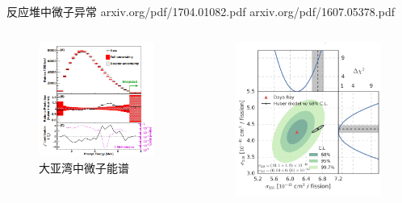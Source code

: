 \documentclass[11pt,compress,xcolor=x11names,UTF8]{beamer}
\begin{document}
\begin{frame}{反应堆中微子异常}
arxiv.org/pdf/1704.01082.pdf\qquad 
arxiv.org/pdf/1607.05378.pdf
\begin{columns}
\begin{column}{.45\textwidth}
\begin{figure}
\centering
\includegraphics[width=\textwidth]{dybspe} %
\caption{大亚湾中微子能谱}
\end{figure}
\end{column}
\begin{column}{.45\textwidth}
\begin{figure}
\centering
\includegraphics[width=\textwidth]{k_dayspe} %

\end{figure}
\end{column}
\end{columns}
\end{frame}
\end{document}
